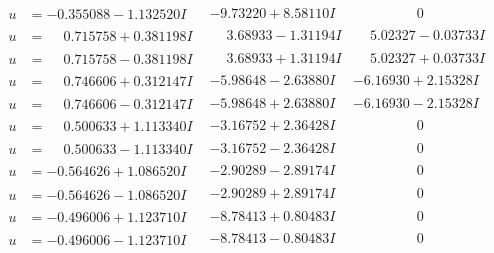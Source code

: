 \documentclass[1p]{elsarticle_modified}
\theoremstyle{definition}
\begin{document}
$$\begin{array}{c|c|c}
\begin{aligned}
u &= -0.355088 - 1.132520 I\end{aligned}
 & -9.73220 + 8.58110 I & \phantom{-0.000000 } 0 \\ \hline\begin{aligned}
u &= \phantom{-}0.715758 + 0.381198 I\end{aligned}
 & \phantom{-}3.68933 - 1.31194 I & \phantom{-}5.02327 - 0.03733 I \\ \hline\begin{aligned}
u &= \phantom{-}0.715758 - 0.381198 I\end{aligned}
 & \phantom{-}3.68933 + 1.31194 I & \phantom{-}5.02327 + 0.03733 I \\ \hline\begin{aligned}
u &= \phantom{-}0.746606 + 0.312147 I\end{aligned}
 & -5.98648 - 2.63880 I & -6.16930 + 2.15328 I \\ \hline\begin{aligned}
u &= \phantom{-}0.746606 - 0.312147 I\end{aligned}
 & -5.98648 + 2.63880 I & -6.16930 - 2.15328 I \\ \hline\begin{aligned}
u &= \phantom{-}0.500633 + 1.113340 I\end{aligned}
 & -3.16752 + 2.36428 I & \phantom{-0.000000 } 0 \\ \hline\begin{aligned}
u &= \phantom{-}0.500633 - 1.113340 I\end{aligned}
 & -3.16752 - 2.36428 I & \phantom{-0.000000 } 0 \\ \hline\begin{aligned}
u &= -0.564626 + 1.086520 I\end{aligned}
 & -2.90289 - 2.89174 I & \phantom{-0.000000 } 0 \\ \hline\begin{aligned}
u &= -0.564626 - 1.086520 I\end{aligned}
 & -2.90289 + 2.89174 I & \phantom{-0.000000 } 0 \\ \hline\begin{aligned}
u &= -0.496006 + 1.123710 I\end{aligned}
 & -8.78413 + 0.80483 I & \phantom{-0.000000 } 0 \\ \hline\begin{aligned}
u &= -0.496006 - 1.123710 I\end{aligned}
 & -8.78413 - 0.80483 I & \phantom{-0.000000 } 0 \\ \hline\begin{aligned}

\end{aligned}
\end{array}$$
\end{document}
